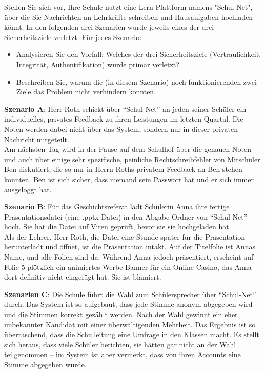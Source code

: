 \begin{myexercise}
    Stellen Sie sich vor, Ihre Schule nutzt eine Lern-Plattform namens "Schul-Net", über die Sie Nachrichten an Lehrkräfte schreiben und Hausaufgaben hochladen könnt.
    In den folgenden drei Szenarien wurde jeweils eines der drei Sicherheitsziele verletzt. 
    Für jedes Szenario:
    \begin{itemize}
        \item Analysieren Sie den Vorfall: Welches der drei Sicherheitsziele (Vertraulichkeit, Integrität, Authentifikation) wurde primär verletzt?
        \item Beschreiben Sie, warum die (in diesem Szenario) noch funktionierenden zwei Ziele das Problem nicht verhindern konnten.
    \end{itemize}
    
    \textbf{Szenario A}: Herr Roth schickt über ``Schul-Net'' an jeden seiner Schüler ein individuelles, privates
    Feedback zu ihren Leistungen im letzten Quartal. Die Noten werden dabei nicht über das System, sondern nur in dieser privaten Nachricht mitgeteilt.\\
    Am nächsten Tag wird in der Pause auf dem Schulhof über die genauen Noten und auch über einige sehr spezifische, peinliche Rechtschreibfehler von Mitschüler Ben diskutiert, die so nur in Herrn Roths privatem Feedback an Ben stehen konnten. Ben ist sich sicher, dass niemand sein Passwort hat und er sich immer ausgeloggt hat.

    \textbf{Szenario B}: Für das Geschichtsreferat lädt Schülerin Anna ihre fertige Präsentationsdatei (eine
    .pptx-Datei) in den Abgabe-Ordner von ``Schul-Net'' hoch. Sie hat die Datei auf Viren geprüft, bevor sie sie
    hochgeladen hat.\\
    Als der Lehrer, Herr Roth, die Datei eine Stunde später für die Präsentation herunterlädt und öffnet, ist die Präsentation intakt. Auf der Titelfolie ist Annas Name, und alle Folien sind da. Während Anna jedoch präsentiert, erscheint auf Folie 5 plötzlich ein animiertes Werbe-Banner für ein Online-Casino, das Anna dort definitiv nicht eingefügt hat. Sie ist blamiert.

    \textbf{Szenarien C}: Die Schule führt die Wahl zum Schülersprecher über ``Schul-Net'' durch. Das System ist so
    aufgebaut, dass jede Stimme anonym abgegeben wird und die Stimmen korrekt gezählt werden. Nach der Wahl gewinnt ein eher unbekannter Kandidat mit einer überwältigenden Mehrheit. Das Ergebnis ist so überraschend, dass die Schulleitung eine Umfrage in den Klassen macht. Es stellt sich heraus, dass viele Schüler berichten, sie hätten gar nicht an der Wahl teilgenommen – im System ist aber vermerkt, dass von ihren Accounts eine Stimme abgegeben wurde.


\end{myexercise}
